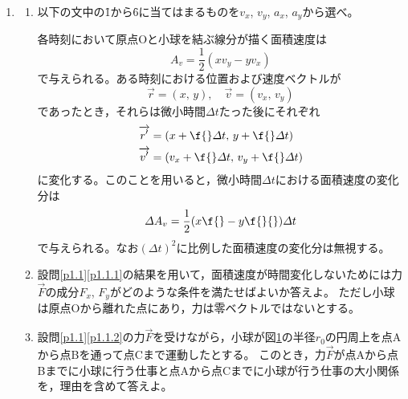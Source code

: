 \documentclass[b5paper, papersize, fleqn, 11pt, dvipdfmx, bold, nodots]{jsarticle}
\begin{document}
\begin{enumerate}[label=\Roman*]
  \item\label{p1.1}{}\relax\empty
  \begin{enumerate}[label=\Kakko*]
    \item\label{p1.1.1} 以下の文中の\f{1}から\f{6}に当てはまるものを$v_x$, $v_y$, $a_x$, $a_y$から選べ。

    各時刻において原点Oと小球を結ぶ線分が描く面積速度は
    \[A_v=\frac{1}{2}(xv_y-yv_x)\]
    で与えられる。ある時刻における位置および速度ベクトルが
    \[\overrightarrow{r}=(x,\,y),\quad\overrightarrow{v}=(v_x,\,v_y)\]
    であったとき，それらは微小時間$\varDelta t$たった後にそれぞれ
    \begin{align*}
      \overrightarrow{r{}'} &= (x+\f{}\varDelta t,\,y+\f{}\varDelta t)\\
      \overrightarrow{v'} &=(v_x+\f{}\varDelta t,\,v_y+\f{}\varDelta t)
    \end{align*}
    に変化する。このことを用いると，微小時間$\varDelta t$における面積速度の変化分は
    \[\varDelta A_v=\frac{1}{2}(x\f{}-y\f{}{})\varDelta t\]
    で与えられる。なお$(\varDelta t)^2$に比例した面積速度の変化分は無視する。

    \item\label{p1.1.2} 設問\ref{p1.1}\ref{p1.1.1}の結果を用いて，面積速度が時間変化しないためには力$\overrightarrow{F}$の成分$F_x$, $F_y$がどのような条件を満たせばよいか答えよ。
    ただし小球は原点Oから離れた点にあり，力は零ベクトルではないとする。

    \newpage

    \item 設問\ref{p1.1}\ref{p1.1.2}の力$\overrightarrow{F}$を受けながら，小球が図\ref{1.1}の半径$r_0$の円周上を点Aから点Bを通って点Cまで運動したとする。
    このとき，力$\overrightarrow{F}$が点Aから点Bまでに小球に行う仕事と点Aから点Cまでに小球が行う仕事の大小関係を，理由を含めて答えよ。

    \begin{figure}[ht]
      \centering
      \caption{}
      \label{1.1}
    \end{figure}
  \end{enumerate}


\end{enumerate}
\end{document}
